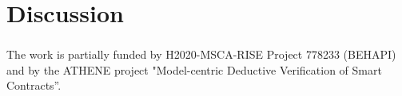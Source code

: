 \documentclass[runningheads]{llncs}
\begin{document}
\section{Discussion}


\begin{credits}
    \subsubsection{\ackname} The work is partially funded by H2020-MSCA-RISE Project 778233 (BEHAPI) and by the ATHENE project "Model-centric Deductive Verification of Smart Contracts”.
\end{credits}



\newpage
\appendix

\end{document}
